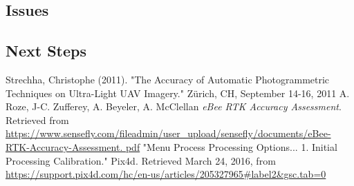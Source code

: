 \documentclass{article}
\begin{document}
\subsection{Issues}
\subsection{Next Steps}
\begin{thebibliography}{9}
Strechha,  Christophe (2011). "The Accuracy of Automatic Photogrammetric Techniques on Ultra-Light 
UAV Imagery."  Zürich, CH, September 
14-16, 2011
A. Roze, J-C. Zufferey, A. Beyeler, A. McClellan \textit{eBee RTK Accuracy Assessment}.
Retrieved from 
\url{https://www.sensefly.com/fileadmin/user_upload/sensefly/documents/eBee-RTK-Accuracy-Assessment.
pdf}
"Menu Process Processing Options... 1. Initial Processing Calibration." Pix4d. Retrieved March 24, 
2016, from \url{https://support.pix4d.com/hc/en-us/articles/205327965#label2&gsc.tab=0}
\end{thebibliography}
\thispagestyle{lastpage}
\end{document}
